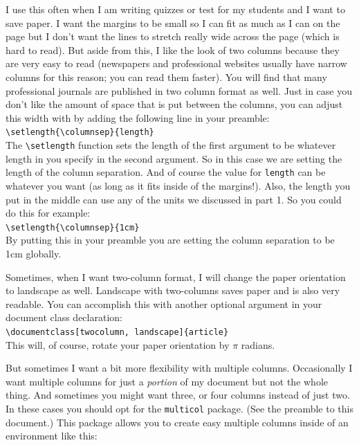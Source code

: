 \documentclass{article}
\newcommand{\nid}{\noindent} %
\begin{document}
I use this often when I am writing quizzes or test for my students and I want to save paper.    I want the margins to be small so I can fit as much as I can on the page but I don't want the lines to stretch really wide across the page (which is hard to read). But aside from this, I like the look of two columns because they are very easy to read (newspapers and professional websites usually have narrow columns for this reason; you can read them faster).  You will find that many professional journals are published in two column format as well.  Just in case you don't like the amount of space that is put between the columns, you can adjust this width with by adding the following line in your preamble:\\

\nid \verb|\setlength{\columnsep}{length}|\\

\nid The \verb|\setlength| function sets the length of the first argument to be whatever length in you specify in the second argument.  So in this case we are setting the length of the column separation.  And of course the value for \texttt{length} can be whatever you want (as long as it fits inside of the margins!).  Also, the length you put in the middle can use any of the units we discussed in part 1.  So you could do this for example:\\

\nid \verb|\setlength{\columnsep}{1cm}|\\

\nid By putting this in your preamble you are setting the column separation to be 1cm globally.

Sometimes, when I want two-column format, I will change the paper orientation to landscape as well.  Landscape with two-columns saves paper and is also very readable.  You can accomplish this with another optional argument in your document class declaration:\\

\verb|\documentclass[twocolumn, landscape]{article}|\\

\nid This will, of course, rotate your paper orientation by $\pi$ radians.

But sometimes I want a bit more flexibility with multiple columns.  Occasionally I want multiple columns for just a \textit{portion} of my document but not the whole thing.  And sometimes you might want three, or four columns instead of just two.  In these cases you should opt for the \texttt{multicol} package. (See the preamble to this document.) This package allows you to create easy multiple columns inside of an environment like this:\\
\end{document}
